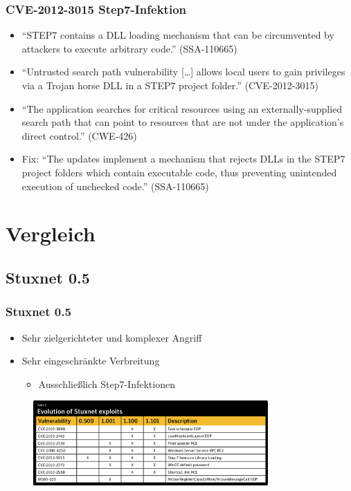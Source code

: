\documentclass{beamer}
\begin{document}
\begin{frame}
  \frametitle{CVE-2012-3015 Step7-Infektion}
  \begin{itemize}
    \item ``STEP7 contains a DLL loading mechanism that can be circumvented by attackers to execute arbitrary code.'' (SSA-110665)
    \item ``Untrusted search path vulnerability […] allows local users to gain privileges via a Trojan horse DLL in a STEP7 project folder.'' (CVE-2012-3015)
    \item ``The application searches for critical resources using an externally-supplied search path that can point to resources that are not under the application's direct control.'' (CWE-426)
    \item Fix: ``The updates implement a mechanism that rejects DLLs in the STEP7 project folders which contain executable code, thus preventing unintended execution of unchecked code.'' (SSA-110665)
  \end{itemize}
\end{frame}

\section{Vergleich}

\subsection{Stuxnet 0.5}

\begin{frame}
  \frametitle{Stuxnet 0.5}
  \begin{itemize}
    \item Sehr zielgerichteter und komplexer Angriff
    \item Sehr eingeschränkte Verbreitung
      \begin{itemize}
        \item Ausschließlich Step7-Infektionen
      \end{itemize}
  \end{itemize}
  \begin{figure}[p]
    \centering
    \includegraphics[width=0.8\textwidth]{../Evolution_exploits.png}
  \end{figure}
\end{frame}
\end{document}
